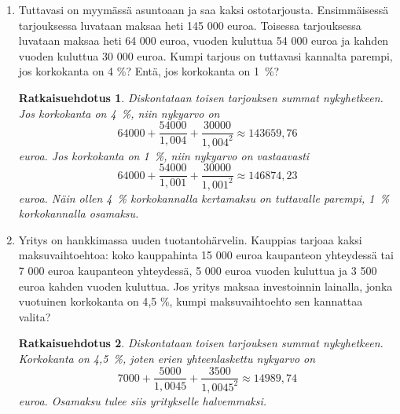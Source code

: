 \documentclass[a4paper,10pt,twoside]{article}
\newtheorem*{ratkaisu}{Ratkaisuehdotus}
\begin{document}
\begin{enumerate}
\item Tuttavasi on myymässä asuntoaan ja saa kaksi ostotarjousta. Ensimmäisessä tarjouksessa luvataan maksaa heti 145 000 euroa.
Toisessa tarjouksessa luvataan maksaa heti 64 000 euroa, vuoden kuluttua 54 000 euroa ja kahden vuoden kuluttua 30 000 euroa.
Kumpi tarjous on tuttavasi kannalta parempi, jos korkokanta on 4 \%? Entä, jos korkokanta on 1~\%?
\begin{ratkaisu}
    Diskontataan toisen tarjouksen summat nykyhetkeen. Jos korkokanta on 4~\%, niin nykyarvo on
    \[
        64000 + \frac{54000}{1,004} + \frac{30000}{1,004^2} \approx 143659,76
    \] euroa.
    Jos korkokanta on 1~\%, niin nykyarvo on vastaavasti
    \[
        64000 + \frac{54000}{1,001} + \frac{30000}{1,001^2} \approx 146874,23
    \] euroa.
    Näin ollen 4~\% korkokannalla kertamaksu on tuttavalle parempi, 1~\% korkokannalla osamaksu.
\end{ratkaisu}

\item Yritys on hankkimassa uuden tuotantohärvelin. Kauppias tarjoaa kaksi maksuvaihtoehtoa:
koko kauppahinta 15 000 euroa kaupanteon yhteydessä tai 7 000 euroa kaupanteon yhteydessä,
5 000 euroa vuoden kuluttua ja 3 500 euroa kahden vuoden kuluttua. Jos yritys maksaa investoinnin lainalla,
jonka vuotuinen korkokanta on 4{,}5 \%, kumpi maksuvaihtoehto sen kannattaa valita?
\begin{ratkaisu}
    Diskontataan toisen tarjouksen summat nykyhetkeen. Korkokanta on 4,5~\%, joten erien yhteenlaskettu nykyarvo on
    \[
        7000 + \frac{5000}{1,0045} + \frac{3500}{1,0045^2} \approx 14989,74
    \]
    euroa. Osamaksu tulee siis yritykselle halvemmaksi.
\end{ratkaisu}

\end{enumerate}
\end{document}
